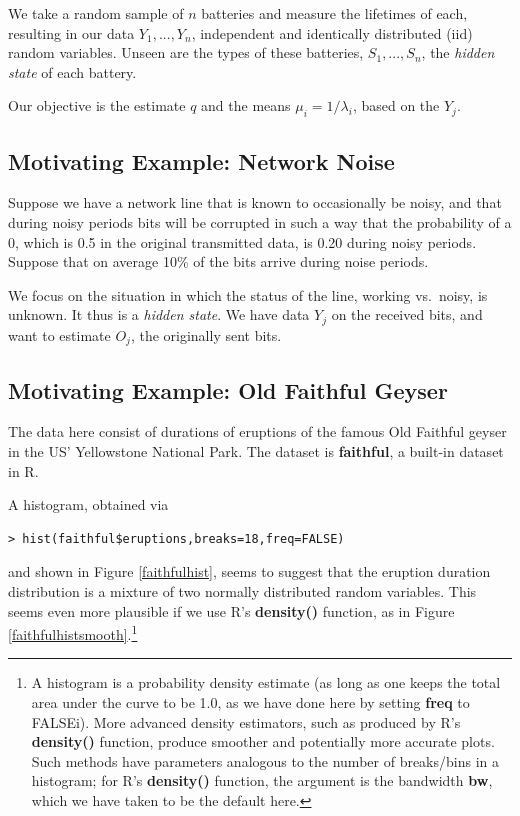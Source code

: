 \documentclass[11pt]{article}
\begin{document}
We take a random sample of $n$ batteries and measure the lifetimes of
each, resulting in our data $Y_1,...,Y_n$, independent and identically
distributed (iid) random variables.  Unseen are the types of these
batteries, $S_1,...,S_n$, the \textit{hidden state} of each battery.

Our objective is the estimate $q$ and the means $\mu_i = 1/\lambda_i$,
based on the $Y_j$.  

\subsection{Motivating Example:  Network Noise}

Suppose we have a network line that is known to occasionally be
noisy, and that during noisy periods bits will be corrupted in such
a way that the probability of a 0, which is 0.5 in the original
transmitted data, is 0.20 during noisy periods.  Suppose that on average
10\% of the bits arrive during noise periods.

We focus on the situation in which the status of the line, working vs.\
noisy, is unknown.  It thus is a \textit{hidden state}.  We have data
$Y_j$ on the received bits, and want to estimate $O_j$, the originally
sent bits.

\subsection{Motivating Example:  Old Faithful Geyser}

The data here consist of durations of eruptions of the famous
Old Faithful geyser in the US' Yellowstone National Park.  The dataset
is \textbf{faithful}, a built-in dataset in R.

A histogram, obtained via 

\begin{lstlisting}
> hist(faithful$eruptions,breaks=18,freq=FALSE)
\end{lstlisting}

and shown in Figure \ref{faithfulhist}, seems to suggest that the
eruption duration distribution is a mixture of two normally distributed random
variables.  This seems even more plausible if we use R's 
\textbf{density()} function, as in Figure
\ref{faithfulhistsmooth}.\footnote{A histogram is a probability density
estimate (as long as one keeps the total area under the curve to be 1.0,
as we have done here by setting \textbf{freq} to FALSEi).  More advanced
density estimators, such as produced by R's \textbf{density()} function,
produce smoother and potentially more accurate plots.  Such methods have
parameters analogous to the number of breaks/bins in a histogram; for
R's \textbf{density()} function, the argument is the bandwidth
\textbf{bw}, which we have taken to be the default here.}
\end{document}
